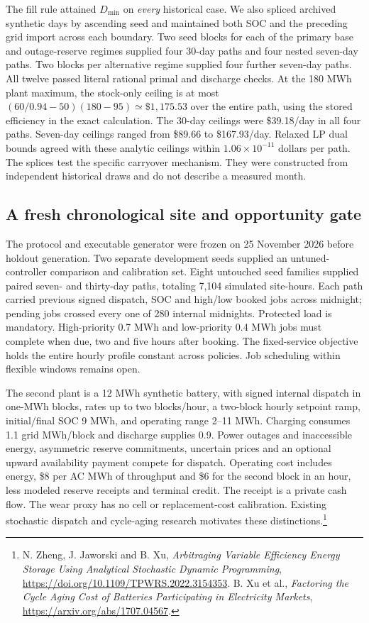 \documentclass[10pt,letterpaper]{article}
\begin{document}
The fill rule attained $D_{\min}$ on \emph{every} historical case. We also spliced archived synthetic days by ascending seed and maintained both SOC and the preceding grid import across each boundary. Two seed blocks for each of the primary base and outage-reserve regimes supplied four 30-day paths and four nested seven-day paths. Two blocks per alternative regime supplied four further seven-day paths. All twelve passed literal rational primal and discharge checks. At the 180 MWh plant maximum, the stock-only ceiling is at most $(60/0.94-50)(180-95)\simeq\$1{,}175.53$ over the entire path, using the stored efficiency in the exact calculation. The 30-day ceilings were \$39.18/day in all four paths. Seven-day ceilings ranged from \$89.66 to \$167.93/day. Relaxed LP dual bounds agreed with these analytic ceilings within $1.06\times10^{-11}$ dollars per path. The splices test the specific carryover mechanism. They were constructed from independent historical draws and do not describe a measured month.

\subsection{A fresh chronological site and opportunity gate}
The protocol and executable generator were frozen on 25 November 2026 before holdout generation. Two separate development seeds supplied an untuned-controller comparison and calibration set. Eight untouched seed families supplied paired seven- and thirty-day paths, totaling 7,104 simulated site-hours. Each path carried previous signed dispatch, SOC and high/low booked jobs across midnight; pending jobs crossed every one of 280 internal midnights. Protected load is mandatory. High-priority 0.7 MWh and low-priority 0.4 MWh jobs must complete when due, two and five hours after booking. The fixed-service objective holds the entire hourly profile constant across policies. Job scheduling within flexible windows remains open.

The second plant is a 12 MWh synthetic battery, with signed internal dispatch in one-MWh blocks, rates up to two blocks/hour, a two-block hourly setpoint ramp, initial/final SOC 9 MWh, and operating range 2--11 MWh. Charging consumes 1.1 grid MWh/block and discharge supplies 0.9. Power outages and inaccessible energy, asymmetric reserve commitments, uncertain prices and an optional upward availability payment compete for dispatch. Operating cost includes energy, \$8 per AC MWh of throughput and \$6 for the second block in an hour, less modeled reserve receipts and terminal credit. The receipt is a private cash flow. The wear proxy has no cell or replacement-cost calibration. Existing stochastic dispatch and cycle-aging research motivates these distinctions.\footnote{N. Zheng, J. Jaworski and B. Xu, \emph{Arbitraging Variable Efficiency Energy Storage Using Analytical Stochastic Dynamic Programming}, \url{https://doi.org/10.1109/TPWRS.2022.3154353}. B. Xu et al., \emph{Factoring the Cycle Aging Cost of Batteries Participating in Electricity Markets}, \url{https://arxiv.org/abs/1707.04567}.}
\end{document}
